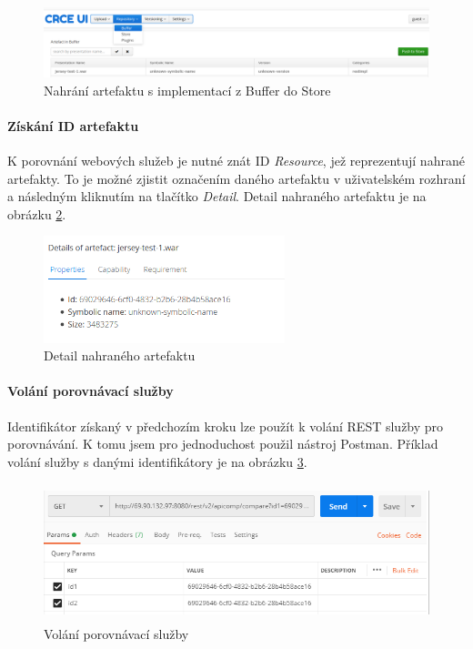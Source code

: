 \documentclass[czech,DP]{thesiskiv}
\begin{document}
\begin{figure}[h]
	\centering
	\includegraphics[width=\linewidth]{crce-art-push-to-store.png}
	\caption{Nahrání artefaktu s implementací z Buffer do Store}
	\label{fig:crce-art-push-to-store}
\end{figure}

\paragraph{Získání ID artefaktu}
K porovnání webových služeb je nutné znát ID \textit{Resource}, jež reprezentují nahrané artefakty. To je možné zjistit označením daného artefaktu v uživatelském rozhraní a následným kliknutím na tlačítko \textit{Detail}. Detail nahraného artefaktu je na obrázku \ref{fig:crce-art-detail}.

\begin{figure}[h]
	\centering
	\includegraphics[width=7cm]{crce-art-detail.png}
	\caption{Detail nahraného artefaktu}
	\label{fig:crce-art-detail}
\end{figure}

\paragraph{Volání porovnávací služby}
Identifikátor získaný v předchozím kroku lze použít k volání REST služby pro porovnávání. K tomu jsem pro jednoduchost použil nástroj Postman. Příklad volání služby s danými identifikátory je na obrázku \ref{fig:apicomp-call}.

\begin{figure}[h]
	\centering
	\includegraphics[height=4cm]{apicomp-call.png}
	\caption{Volání porovnávací služby}
	\label{fig:apicomp-call}
\end{figure}
\end{document}
